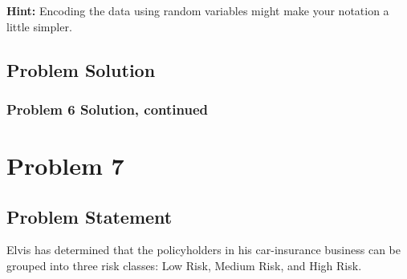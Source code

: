 \documentclass[12pt]{article}
\theoremstyle{definition}
\begin{document}
\bigskip
\noindent
{\bf Hint:} Encoding the data using random variables might make your notation a little simpler.

\newpage
\subsection*{Problem Solution}


\newpage
\subsubsection*{Problem 6 Solution, continued}



\newpage
\section*{Problem 7}


\subsection*{Problem Statement}

Elvis has determined that the policyholders in his car-insurance business can be grouped into three risk classes: Low Risk, Medium Risk, and High Risk.
\end{document}
